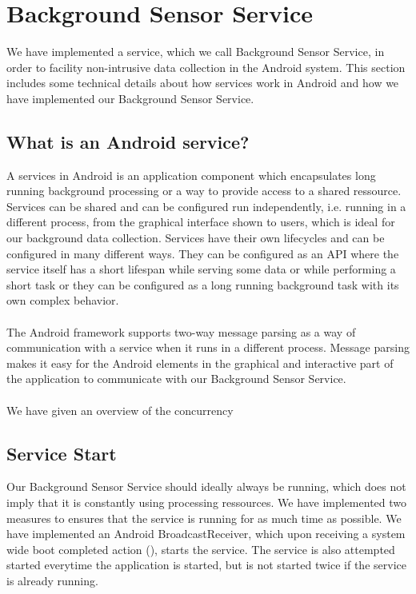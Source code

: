 
\section{Background Sensor Service}
\label{sec:background_sensor_service}

We have implemented a service, which we call Background Sensor Service, in order to facility non-intrusive data collection in the Android system.
This section includes some technical details about how services work in Android and how we have implemented our Background Sensor Service. 

\subsection{What is an Android service?}

A services in Android is an application component which encapsulates long running background processing or a way to provide access to a shared ressource. Services can be shared and can be configured run independently, i.e. running in a different process, from the graphical interface shown to users, which is ideal for our background data collection. Services have their own lifecycles and can be configured in many different ways. They can be configured as an API where the service itself has a short lifespan while serving some data or while performing a short task or they can be configured as a long running background task with its own complex behavior.
\\\\
The Android framework supports two-way message parsing as a way of communication with a service when it runs in a different process. Message parsing makes it easy for the Android  elements in the graphical and interactive part of the application to communicate with our Background Sensor Service.
\\\\
We have given an overview of the concurrency 

\subsection{Service Start}

Our Background Sensor Service should ideally always be running, which does not imply that it is constantly using processing ressources. We have implemented two measures to ensures that the service is running for as much time as possible. We have implemented an Android BroadcastReceiver, which upon receiving a system wide boot completed action (), starts the service. The service is also attempted started everytime the application is started, but is not started twice if the service is already running. 

